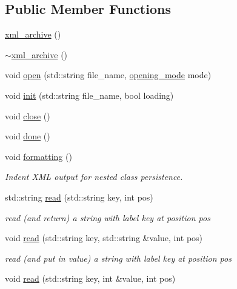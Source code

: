 \subsection*{Public Member Functions}
\begin{DoxyCompactItemize}
\item 
\hyperlink{classeternity_1_1xml__archive_a51f29738b694efdf35486b8d6146f7c8}{xml\+\_\+archive} ()
\item 
\hyperlink{classeternity_1_1xml__archive_aed17710a8c15f35f9296d8805299f619}{$\sim$xml\+\_\+archive} ()
\item 
void \hyperlink{classeternity_1_1xml__archive_acd5ef97a7b6a113e64e735270634bea1}{open} (std\+::string file\+\_\+name, \hyperlink{classeternity_1_1archive_a8881f9ce8dbed2ee600c64b7925afef0}{opening\+\_\+mode} mode)
\item 
void \hyperlink{classeternity_1_1xml__archive_a27ed416689f3c9da532fcb91eed88217}{init} (std\+::string file\+\_\+name, bool loading)
\item 
void \hyperlink{classeternity_1_1xml__archive_a9f27feeac62aa0c3370ef9bcc60d86c6}{close} ()
\item 
void \hyperlink{classeternity_1_1xml__archive_a946e60b3bd83fc8cf65d740b4ebf63e0}{done} ()
\item 
void \hyperlink{classeternity_1_1xml__archive_a53816e7723e949920db15981b91fc3c1}{formatting} ()
\begin{DoxyCompactList}\small\item\em Indent X\+ML output for nested class persistence. \end{DoxyCompactList}\item 
std\+::string \hyperlink{classeternity_1_1xml__archive_a2e0b9a16f4b02b391967718f18175fc2}{read} (std\+::string key, int pos)
\begin{DoxyCompactList}\small\item\em read (and return) a string with label key at position pos \end{DoxyCompactList}\item 
void \hyperlink{classeternity_1_1xml__archive_ac8267a952c5c9a6caa8b434f80d1b9d2}{read} (std\+::string key, std\+::string \&value, int pos)
\begin{DoxyCompactList}\small\item\em read (and put in value) a string with label key at position pos \end{DoxyCompactList}\item 
void \hyperlink{classeternity_1_1xml__archive_adbfbeeb5a86ecf4bfccdba1054d9c50a}{read} (std\+::string key, int \&value, int pos)

\end{DoxyCompactItemize}
